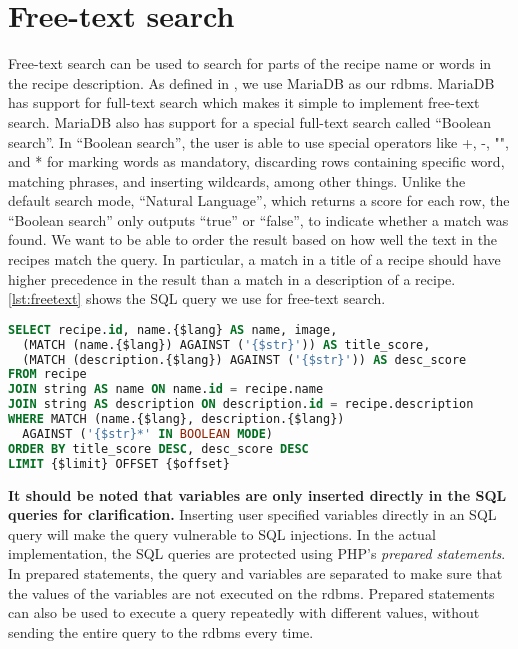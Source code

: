 \section{Free-text search}
Free-text search can be used to search for parts of the recipe name or words in the recipe description. As defined in , we use MariaDB as our \ac{rdbms}. MariaDB has support for full-text search which makes it simple to implement free-text search. MariaDB also has support for a special full-text search called ``Boolean search''\cite{mariafulltext}. In ``Boolean search'', the user is able to use special operators like  +, -, "", and *  for marking words as mandatory, discarding rows containing specific word, matching phrases, and inserting wildcards, among other things. Unlike the default search mode, ``Natural Language'', which returns a score for each row, the ``Boolean search'' only outputs ``true'' or ``false'', to indicate whether a match was found. We want to be able to order the result based on how well the text in the recipes match the query. In particular, a match in a title of a recipe should have higher precedence in the result than a match in a description of a recipe.
\autoref{lst:freetext} shows the SQL query we use for free-text search.

\begin{lstlisting}[language=SQL, morekeywords={AGAINST,OFFSET,BOOLEAN,MODE}, float=h, label={lst:freetext}, caption={Free-text search.}]
SELECT recipe.id, name.{$lang} AS name, image,
  (MATCH (name.{$lang}) AGAINST ('{$str}')) AS title_score,
  (MATCH (description.{$lang}) AGAINST ('{$str}')) AS desc_score
FROM recipe
JOIN string AS name ON name.id = recipe.name
JOIN string AS description ON description.id = recipe.description
WHERE MATCH (name.{$lang}, description.{$lang})
  AGAINST ('{$str}*' IN BOOLEAN MODE)
ORDER BY title_score DESC, desc_score DESC
LIMIT {$limit} OFFSET {$offset}
\end{lstlisting}
\textbf{It should be noted that variables are only inserted directly in the SQL queries for clarification.} Inserting user specified variables directly in an SQL query will make the query vulnerable to SQL injections. In the actual implementation, the SQL queries are protected using PHP's \textit{prepared statements}. In prepared statements, the query and variables are separated to make sure that the values of the variables are not executed on the \ac{rdbms}. Prepared statements can also be used to execute a query repeatedly with different values, without sending the entire query to the \ac{rdbms} every time.

